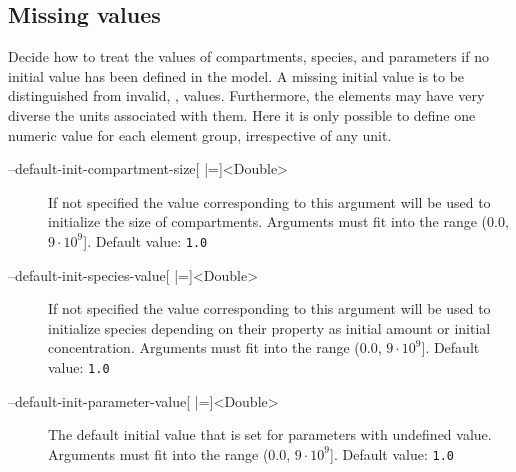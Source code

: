 \subsection{Missing values}
Decide how to treat the values of compartments, species, and parameters if no initial value has been defined in the model. A missing initial value is to be distinguished from invalid, \ie \NaN, values. Furthermore, the elements may have very diverse the units associated with them. Here it is only possible to define one numeric value for each element group, irrespective of any unit.
\begin{description}
\item[--default-init-compartment-size{[} |={]}<Double>]
          If not specified the value corresponding to this argument will
          be used to initialize the size of compartments.
          Arguments must fit into the range (0.0, $9\cdot 10^9${]}.
          Default value: \texttt{1.0}
\item[--default-init-species-value{[} |={]}<Double>]
          If not specified the value corresponding to this argument will
          be used to initialize species depending on their \hasOnlySubstanceUnits
          property as initial amount or initial concentration.
          Arguments must fit into the range (0.0, $9\cdot 10^9${]}.
          Default value: \texttt{1.0}
\item[--default-init-parameter-value{[} |={]}<Double>]
          The default initial value that is set for parameters with undefined value.
          Arguments must fit into the range (0.0, $9\cdot 10^9${]}.
          Default value: \texttt{1.0}
\end{description}

